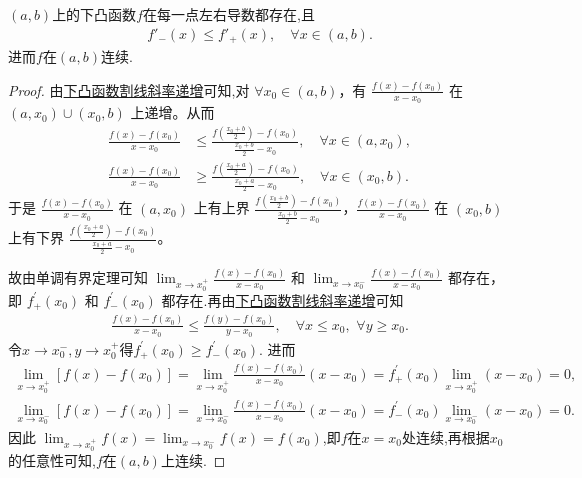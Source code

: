 \documentclass[../../main.tex]{subfiles}%
\begin{document}
\begin{theorem}[开区间下凸函数左右导数处处存在]\label{theorem:开区间下凸函数左右导数处处存在}
\((a,b)\)上的下凸函数\(f\)在每一点左右导数都存在,且
\begin{align*}
f'_-(x)\leqslant f'_+(x),\quad \forall x\in (a,b).
\end{align*}
进而\(f\)在\((a,b)\)连续.
\end{theorem}
\begin{proof}
由\hyperref[下凸函数割线斜率递增]{下凸函数割线斜率递增}可知,对 $\forall x_0\in (a,b)$，有 $\frac{f(x) - f(x_0)}{x - x_0}$ 在 $(a,x_0) \cup (x_0,b)$ 上递增。从而
\begin{align*}
\frac{f(x) - f(x_0)}{x - x_0} &\leqslant \frac{f\left(\frac{x_0 + b}{2}\right) - f(x_0)}{\frac{x_0 + b}{2} - x_0}, \quad \forall x\in (a,x_0), \\
\frac{f(x) - f(x_0)}{x - x_0} &\geqslant \frac{f\left(\frac{x_0 + a}{2}\right) - f(x_0)}{\frac{x_0 + a}{2} - x_0}, \quad \forall x\in (x_0,b).
\end{align*}
于是 $\frac{f(x) - f(x_0)}{x - x_0}$ 在 $(a,x_0)$ 上有上界 $\frac{f\left(\frac{x_0 + b}{2}\right) - f(x_0)}{\frac{x_0 + b}{2} - x_0}$，$\frac{f(x) - f(x_0)}{x - x_0}$ 在 $(x_0,b)$ 上有下界 $\frac{f\left(\frac{x_0 + a}{2}\right) - f(x_0)}{\frac{x_0 + a}{2} - x_0}$。

故由单调有界定理可知 $\lim_{x \to x_0^+} \frac{f(x) - f(x_0)}{x - x_0}$ 和 $\lim_{x \to x_0^-} \frac{f(x) - f(x_0)}{x - x_0}$ 都存在，即 $f_{+}^{\prime}(x_0)$ 和 $f_{-}^{\prime}(x_0)$ 都存在.再由\hyperref[下凸函数割线斜率递增]{下凸函数割线斜率递增}可知
\begin{align*}
\frac{f\left( x \right) -f\left( x_0 \right)}{x-x_0}\leqslant \frac{f\left( y \right) -f\left( x_0 \right)}{y-x_0},\quad \forall x\leqslant x_0,\,\,\forall y\geqslant x_0.
\end{align*}
令$x\to x_0^-,y\to x_0^+$得$f_{+}^{\prime}(x_0)\geqslant f_{-}^{\prime}(x_0)$.
进而
\begin{gather*}
\lim_{x\rightarrow x_{0}^{+}} [f(x)-f(x_0)]=\lim_{x\rightarrow x_{0}^{+}} \frac{f(x)-f(x_0)}{x-x_0}(x-x_0)=f_{+}^{\prime}(x_0)\lim_{x\rightarrow x_{0}^{+}} (x-x_0)=0,
\\
\lim_{x\rightarrow x_{0}^{-}} [f(x)-f(x_0)]=\lim_{x\rightarrow x_{0}^{-}} \frac{f(x)-f(x_0)}{x-x_0}(x-x_0)=f_{-}^{\prime}(x_0)\lim_{x\rightarrow x_{0}^{-}} (x-x_0)=0.
\end{gather*}
因此 $\lim_{x \to x_0^+} f(x) = \lim_{x \to x_0^-} f(x) = f(x_0)$,即$f$在$x=x_0$处连续,再根据$x_0$的任意性可知,$f$在$(a,b)$上连续.
\end{proof}
\end{document}
